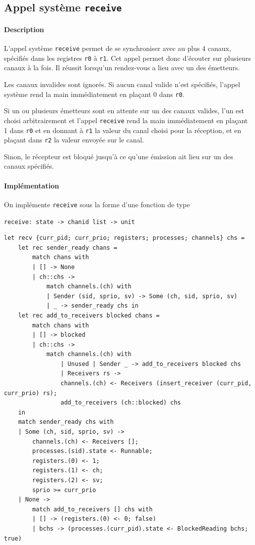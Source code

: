 \documentclass[french, toc]{../cs-classes/cs-classes}
\begin{document}
\subsection{Appel système \texttt{receive}}
\paragraph*{Description}
L'appel système \texttt{receive} permet de se synchroniser avec au plus 4 canaux, spécifiés dans les registres \texttt{r0} à \texttt{r1}. Cet appel permet donc d'écouter sur plusieurs canaux à la fois. Il réussit lorsqu'un rendez-vous a lieu avec un des émetteurs. 

Les canaux invalides sont ignorés. Si aucun canal valide n'est spécifiés, l'appel système rend la main immédiatement en plaçant 0 dans \texttt{r0}.

Si un ou plusieurs émetteurs sont en attente sur un des canaux valides, l'un est choisi arbitrairement et l'appel \texttt{receive} rend la main immédiatement en plaçant 1 dans \texttt{r0} et en donnant à \texttt{r1} la valeur du canal choisi pour la réception, et en plaçant dans \texttt{r2} la valeur envoyée sur le canal.

Sinon, le récepteur est bloqué jusqu'à ce qu'une émission ait lieu sur un des canaux spécifiés.

\paragraph*{Implémentation} On implémente \texttt{receive} sous la forme d'une fonction de type
\begin{center}
    \texttt{receive: state -> chanid list -> unit}
\end{center}

\begin{verbatim}
let recv {curr_pid; curr_prio; registers; processes; channels} chs =
    let rec sender_ready chans =
        match chans with
        | [] -> None
        | ch::chs ->
            match channels.(ch) with
            | Sender (sid, sprio, sv) -> Some (ch, sid, sprio, sv)
            | _ -> sender_ready chs in
    let rec add_to_receivers blocked chans =
        match chans with
        | [] -> blocked
        | ch::chs ->
            match channels.(ch) with
                | Unused | Sender _ -> add_to_receivers blocked chs
                | Receivers rs ->
                channels.(ch) <- Receivers (insert_receiver (curr_pid, curr_prio) rs);
                add_to_receivers (ch::blocked) chs
    in 
    match sender_ready chs with
    | Some (ch, sid, sprio, sv) ->
        channels.(ch) <- Receivers [];
        processes.(sid).state <- Runnable;
        registers.(0) <- 1;
        registers.(1) <- ch;
        registers.(2) <- sv;
        sprio >= curr_prio
    | None ->
        match add_to_receivers [] chs with
        | [] -> (registers.(0) <- 0; false)
        | bchs -> (processes.(curr_pid).state <- BlockedReading bchs; true)
\end{verbatim}
\end{document}
